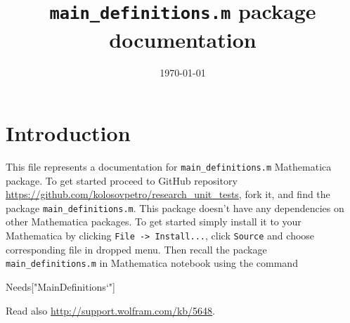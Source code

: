 \documentclass[12pt, letterpaper]{amsart}
\title[main\_definitions.m package documentation]
{\texttt{main\_definitions.m} package documentation}
\date{\today}
\theoremstyle{definition}
\theoremstyle{remark}
\numberwithin{equation}{section}
\begin{document}
\maketitle
\tableofcontents
\section{Introduction}
This file represents a documentation for \texttt{main\_definitions.m} Mathematica package. To get started proceed to GitHub repository \href{https://github.com/KolosovPetro/research_unit_tests}{\textsf{https://github.com/kolosovpetro/research\_unit\_tests}}, fork it, and find the package \texttt{main\_definitions.m}. This package doesn't have any dependencies on other Mathematica packages. To get started simply install it to your Mathematica by clicking \verb"File -> Install...", click \verb"Source" and choose corresponding file in dropped menu. Then recall the package \verb"main_definitions.m" in Mathematica notebook using the command

\begin{center}
\textsf{Needs["MainDefinitions`"]}
\end{center}

Read also \href{http://support.wolfram.com/kb/5648}{\textsf{http://support.wolfram.com/kb/5648}}.
\end{document}
